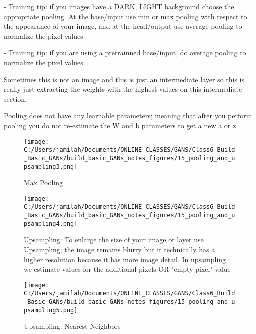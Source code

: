 \documentclass[11pt, onecolumn]{article}
\begin{document}
- Training tip: if you images have a DARK, LIGHT background choose the appropriate pooling.  At the base/input use min or max pooling with respect to the appearance of your image, and at the head/output use average pooling to normalize the pixel values

- Training tip: if you are using a pretrainned base/input, do average pooling to normalize the pixel values

Sometimes this is not an image and this is just an intermediate layer so this is really just extracting the weights with the highest values on this intermediate section.

Pooling does not have any learnable parameters; meaning that after you perform pooling you do not re-estimate the W and b parameters to get a new a or z

\begin{figure}[htp]
\begin{center}
\texttt{[image: C:/Users/jamilah/Documents/ONLINE\_CLASSES/GANS/Class6\_Build\_Basic\_GANs/build\_basic\_GANs\_notes\_figures/15\_pooling\_and\_upsampling3.png]}
\end{center}
\caption{Max Pooling}
\label{15_pooling_and_upsampling3}
\end{figure}

\begin{figure}[htp]
\begin{center}
\texttt{[image: C:/Users/jamilah/Documents/ONLINE\_CLASSES/GANS/Class6\_Build\_Basic\_GANs/build\_basic\_GANs\_notes\_figures/15\_pooling\_and\_upsampling4.png]}
\end{center}
\caption{Upsampling: To enlarge the size of your image or layer use Upsampling; the image remains blurry but it technically has a higher resolution because it has more image detail. In upsampling we estimate values for the additional pixels OR "empty pixel" value}
\label{15_pooling_and_upsampling4}
\end{figure}

\begin{figure}[htp]
\begin{center}
\texttt{[image: C:/Users/jamilah/Documents/ONLINE\_CLASSES/GANS/Class6\_Build\_Basic\_GANs/build\_basic\_GANs\_notes\_figures/15\_pooling\_and\_upsampling5.png]}
\end{center}
\caption{Upsampling: Nearest Neighbors}
\label{15_pooling_and_upsampling5}
\end{figure}
\end{document}
